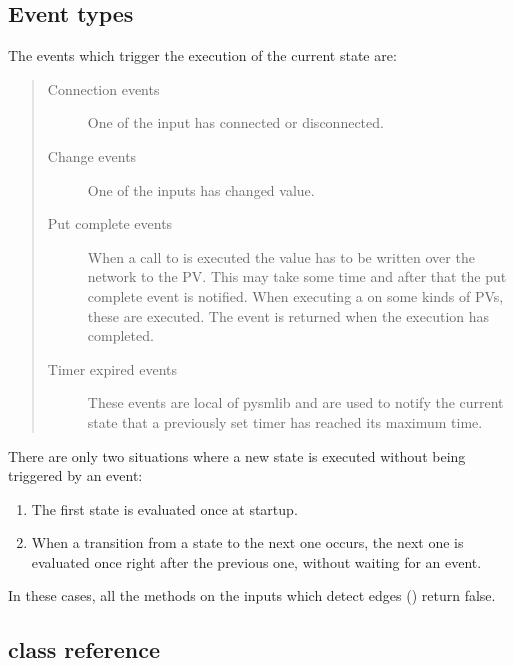 \documentclass[letterpaper,10pt,english]{sphinxmanual}
\begin{document}
\subsection{Event types}
\label{\detokenize{fsm:event-types}}\label{\detokenize{fsm:id1}}
The events which trigger the execution of the current state are:
\begin{quote}
\begin{description}
\item[{Connection events}] \leavevmode
One of the input has connected or disconnected.

\item[{Change events}] \leavevmode
One of the inputs has changed value.

\item[{Put complete events}] \leavevmode
When a call to  is executed the value has to be written over
the network to the PV. This may take some time and after that the put
complete event is notified. When executing a  on some kinds of
PVs, these are executed. The event is returned when the execution has
completed.

\item[{Timer expired events}] \leavevmode
These events are local of pysmlib and are used to notify the current
state that a previously set timer has reached its maximum time.

\end{description}
\end{quote}

There are only two situations where a new state is executed without being
triggered by an event:
\begin{enumerate}
\item {} 
The first state is evaluated once at startup.

\item {} 
When a transition from a state to the next one occurs, the next one is   evaluated once right after the previous one, without waiting for an event.

\end{enumerate}

In these cases, all the methods on the inputs which detect edges
({\hyperref[\detokenize{io:io-edges}]{}}) return false.


\subsection{ class reference}
\label{\detokenize{fsm:fsmbase-class-reference}}
\end{document}

